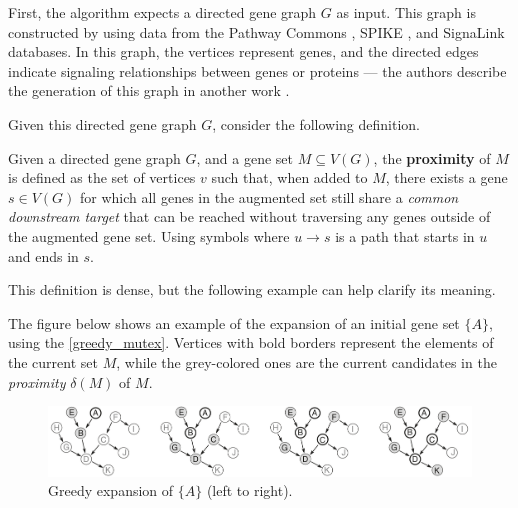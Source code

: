 First, the algorithm expects a directed gene graph $G$ as input. This graph is constructed by \textcite{mutex} using data from the Pathway Commons \cite{pathway_commons}, SPIKE \cite{spike}, and SignaLink \cite{signalink} databases. In this graph, the vertices represent genes, and the directed edges indicate signaling relationships between genes or proteins --- the authors describe the generation of this graph in another work \cite{g_gen}.

Given this directed gene graph $G$, consider the following definition.

\begin{definition}[Proximity] \label{proximity}
    Given a directed gene graph $G$, and a gene set $M \subseteq V(G)$, the \textbf{proximity} of $M$ is defined as the set of vertices $v$ such that, when added to $M$, there exists a gene $s \in V(G)$ for which all genes in the augmented set still share a \textit{common downstream target} that can be reached without traversing any genes outside of the augmented gene set. Using symbols  where $u \to s$ is a path that starts in $u$ and ends in $s$.
\end{definition}

This definition is dense, but the following example \cite{mutex} can help clarify its meaning.

\begin{example}[Proximity]
    The figure below shows an example of the expansion of an initial gene set $\{A\}$, using the \cref{greedy_mutex}. Vertices with bold borders represent the elements of the current set $M$, while the grey-colored ones are the current candidates in the \textit{proximity} $\delta(M)$ of $M$.

    \begin{figure}[H]
        \centering
        \includegraphics[scale=0.27]{../assets/greedy_mutex.png}
        
        \caption{Greedy expansion of $\{A\}$ (left to right).}
    \end{figure}
\end{example}

